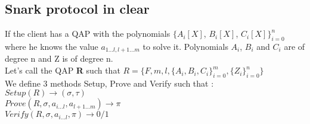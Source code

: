 \subsection{Snark protocol in clear}
If the client has a QAP with the polynomials $\{A_i[X]$, $B_i[X]$, $C_i[X]\}_{i=0}^n$ where he knows the value $a_{1...l,l+1...m}$ to solve it. Polynomials $A_i$, $B_i$ and $C_i$ are of degree n and Z is of degree n. 
\\ Let's call the QAP \textbf{R} such that  $R = \{F, m, l, \{A_i, B_i, C_i\}_{i=0}^m, \{Z_i\}_{i=0}^n\}$
\\ We define 3 methods Setup, Prove and Verify such that :
\\$Setup(R) \rightarrow (\sigma,\tau)$ 
\\$Prove(R, \sigma, a_{i...l}, a_{l+1...m}) \rightarrow \pi$
\\$Verify(R, \sigma, a_{i...l}, \pi) \rightarrow 0/1$











